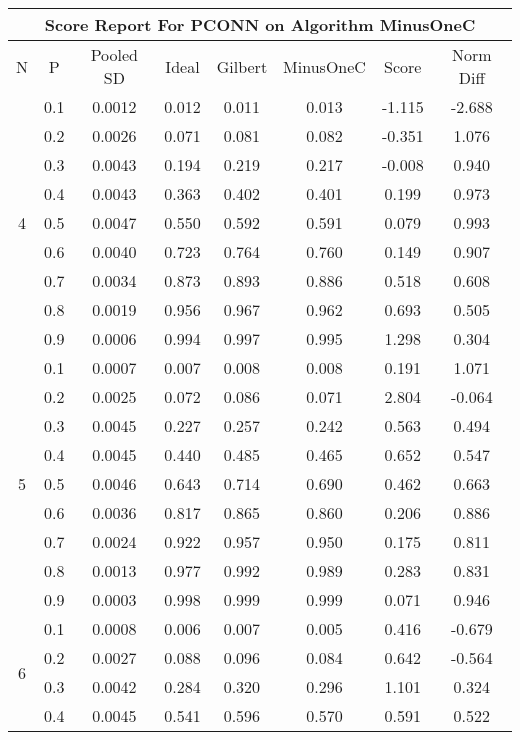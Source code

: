 \documentclass[11pt,a4paper]{report}
\begin{document}
\begin{longtable}{ | c | c || c | c | c | c | c | c | }
\hline
\multicolumn{8}{|c|}{ Score Report For PCONN on Algorithm MinusOneC} \\
\hline
N & P & Pooled SD &  Ideal &  Gilbert & MinusOneC  & Score & Norm Diff \\
 \hline
 \hline
 \endhead
\multirow{9}{*}{4} & 0.1 & 0.0012 & 0.012 & 0.011 & 0.013 & -1.115 & -2.688 \\
 & 0.2 & 0.0026 & 0.071 & 0.081 & 0.082 & -0.351 & 1.076 \\
 & 0.3 & 0.0043 & 0.194 & 0.219 & 0.217 & -0.008 & 0.940 \\
 & 0.4 & 0.0043 & 0.363 & 0.402 & 0.401 & 0.199 & 0.973 \\
 & 0.5 & 0.0047 & 0.550 & 0.592 & 0.591 & 0.079 & 0.993 \\
 & 0.6 & 0.0040 & 0.723 & 0.764 & 0.760 & 0.149 & 0.907 \\
 & 0.7 & 0.0034 & 0.873 & 0.893 & 0.886 & 0.518 & 0.608 \\
 & 0.8 & 0.0019 & 0.956 & 0.967 & 0.962 & 0.693 & 0.505 \\
 & 0.9 & 0.0006 & 0.994 & 0.997 & 0.995 & 1.298 & 0.304 \\
 \hline
\multirow{9}{*}{5} & 0.1 & 0.0007 & 0.007 & 0.008 & 0.008 & 0.191 & 1.071 \\
 & 0.2 & 0.0025 & 0.072 & 0.086 & 0.071 & 2.804 & -0.064 \\
 & 0.3 & 0.0045 & 0.227 & 0.257 & 0.242 & 0.563 & 0.494 \\
 & 0.4 & 0.0045 & 0.440 & 0.485 & 0.465 & 0.652 & 0.547 \\
 & 0.5 & 0.0046 & 0.643 & 0.714 & 0.690 & 0.462 & 0.663 \\
 & 0.6 & 0.0036 & 0.817 & 0.865 & 0.860 & 0.206 & 0.886 \\
 & 0.7 & 0.0024 & 0.922 & 0.957 & 0.950 & 0.175 & 0.811 \\
 & 0.8 & 0.0013 & 0.977 & 0.992 & 0.989 & 0.283 & 0.831 \\
 & 0.9 & 0.0003 & 0.998 & 0.999 & 0.999 & 0.071 & 0.946 \\
 \hline
\multirow{9}{*}{6} & 0.1 & 0.0008 & 0.006 & 0.007 & 0.005 & 0.416 & -0.679 \\
 & 0.2 & 0.0027 & 0.088 & 0.096 & 0.084 & 0.642 & -0.564 \\
 & 0.3 & 0.0042 & 0.284 & 0.320 & 0.296 & 1.101 & 0.324 \\
 & 0.4 & 0.0045 & 0.541 & 0.596 & 0.570 & 0.591 & 0.522 \\

\end{longtable}
\end{document}
